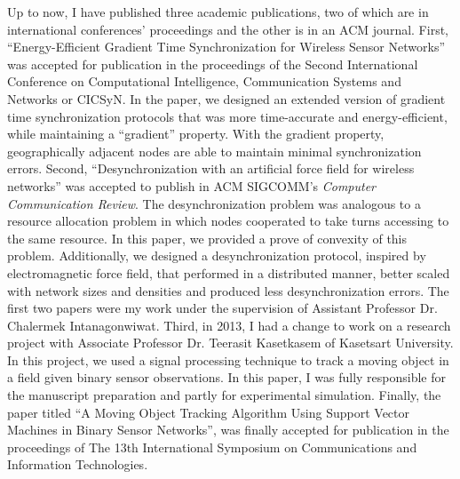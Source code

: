 \documentclass[10pt,a4paper,oneside]{report}
\begin{document}
\vspace{0.2cm}
Up to now, I have published three academic publications, two of which are in international conferences' proceedings and the other is in an ACM journal.  First, ``Energy-Efficient Gradient Time Synchronization for Wireless Sensor Networks'' was accepted for publication in the proceedings of the Second International Conference on Computational Intelligence, Communication Systems and Networks or CICSyN. In the paper, we designed an extended version of gradient time synchronization protocols that was more time-accurate and energy-efficient, while maintaining a ``gradient'' property. With the gradient property, geographically adjacent nodes are able to maintain minimal synchronization errors. Second, ``Desynchronization with an artificial force field for wireless networks'' was accepted to publish in ACM SIGCOMM's \textit{Computer Communication Review}. The desynchronization problem was analogous to a resource allocation problem in which nodes cooperated to take turns accessing to the same resource. In this paper, we provided a prove of convexity of this problem. Additionally, we designed a desynchronization protocol, inspired by electromagnetic force field, that performed in a distributed manner, better scaled with network sizes and densities and produced less desynchronization errors. The first two papers were my work under the supervision of Assistant Professor Dr. Chalermek Intanagonwiwat. Third, in 2013, I had a change to work on a research project with Associate Professor Dr. Teerasit Kasetkasem of Kasetsart University. In this project, we used a signal processing technique to track a moving object in a field given binary sensor observations. In this paper, I was fully responsible for the manuscript preparation and partly for experimental simulation. Finally, the paper titled ``A Moving Object Tracking Algorithm Using Support Vector Machines in Binary Sensor Networks'', was finally accepted for publication in the proceedings of The 13th International Symposium on Communications and Information Technologies.
\end{document}
